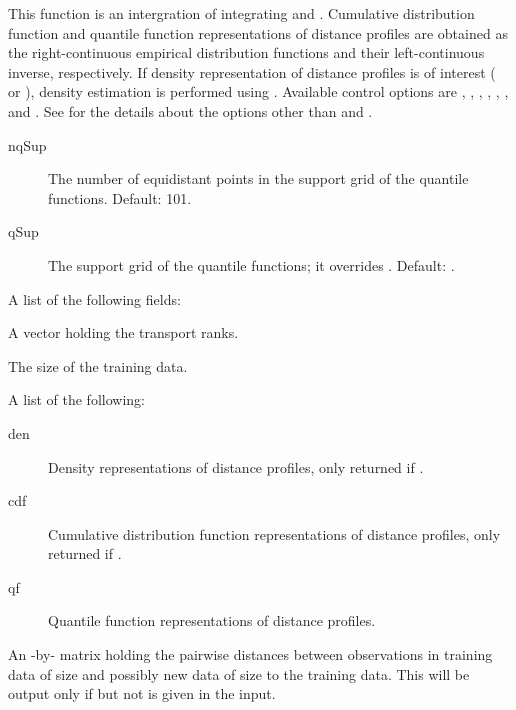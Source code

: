 \documentclass[a4paper]{book}
\begin{document}
%
\begin{Details}\relax
This function is an intergration of integrating  and . 
Cumulative distribution function and quantile function representations of 
distance profiles are obtained as the right-continuous empirical distribution functions 
and their left-continuous inverse, respectively. 
If density representation of distance profiles is of interest 
( or ), 
density estimation is performed using .
Available control options are , , , , 
, ,  and . 
See  for the details about the options 
other than  and .
\begin{description}

\item[nqSup] The number of equidistant points in the support grid of the quantile functions. 
Default: 101.
\item[qSup] The support grid of the quantile functions; it overrides . 
Default: .

\end{description}

\end{Details}
%
\begin{Value}
A list of the following fields:
\begin{ldescription}
\item[\code{rank}] A vector holding the transport ranks.
\item[\code{n}] The size of the training data.
\item[\code{profile}] A list of the following:
\begin{description}

\item[den] Density representations of distance profiles, only returned if .
\item[cdf] Cumulative distribution function representations of distance profiles, only returned if .
\item[qf] Quantile function representations of distance profiles.

\end{description}

\item[\code{distmat}] An -by- matrix holding the pairwise distances between observations 
in training data of size  and possibly new data of size  to the training data. 
This will be output only if  but not  is given in the input.
\end{ldescription}
\end{Value}
\end{document}
